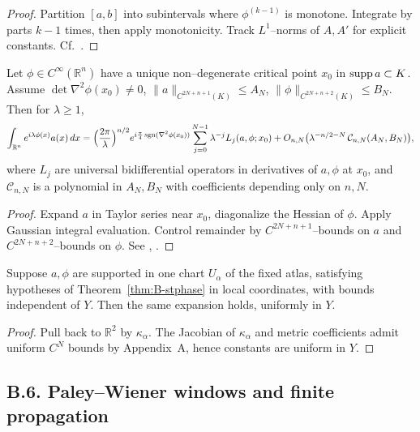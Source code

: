 \begin{proof}
Partition $[a,b]$ into subintervals where $\phi^{(k-1)}$ is monotone.
Integrate by parts $k-1$ times, then apply monotonicity.
Track $L^1$–norms of $A,A'$ for explicit constants.
Cf.\ \cite[Ch.~VIII, Thm.~1]{Stein93}.
\end{proof}

\begin{theorem}
\label{thm:B-stphase}
Let $\phi\in C^\infty(\mathbb R^n)$ have a unique non–degenerate critical point
$x_0$ in $\operatorname{supp} a\subset K$. Assume $\det\nabla^2\phi(x_0)\ne0$,
$\|a\|_{C^{2N+n+1}(K)}\le A_N$, $\|\phi\|_{C^{2N+n+2}(K)}\le B_N$.
Then for $\lambda\ge1$,
\[
\int_{\mathbb R^n} e^{i\lambda\phi(x)}a(x)\,dx
=\Big(\frac{2\pi}{\lambda}\Big)^{n/2}
 e^{i\frac{\pi}{4}\operatorname{sgn}(\nabla^2\phi(x_0))}
 \sum_{j=0}^{N-1}\lambda^{-j}L_j(a,\phi;x_0)
+O_{n,N}\big(\lambda^{-n/2-N}\,\mathcal C_{n,N}(A_N,B_N)\big),
\]
where $L_j$ are universal bidifferential operators in derivatives of $a,\phi$ at $x_0$,
and $\mathcal C_{n,N}$ is a polynomial in $A_N,B_N$ with coefficients depending only on $n,N$.
\end{theorem}

\begin{proof}
Expand $a$ in Taylor series near $x_0$, diagonalize the Hessian of $\phi$.
Apply Gaussian integral evaluation. Control remainder by $C^{2N+n+1}$–bounds on $a$
and $C^{2N+n+2}$–bounds on $\phi$. See \cite[Thm.~7.7.5]{HormanderI}, \cite[§3]{Zworski}.
\end{proof}

\begin{corollary}
\label{cor:B-stphase-charts}
Suppose $a,\phi$ are supported in one chart $U_\alpha$ of the fixed atlas,
satisfying hypotheses of Theorem~\ref{thm:B-stphase} in local coordinates,
with bounds independent of $Y$. Then the same expansion holds, uniformly in $Y$.
\end{corollary}

\begin{proof}
Pull back to $\mathbb R^2$ by $\kappa_\alpha$. The Jacobian of $\kappa_\alpha$ and metric
coefficients admit uniform $C^N$ bounds by Appendix~A, hence constants are uniform in $Y$.
\end{proof}

\subsection*{B.6. Paley–Wiener windows and finite propagation}
\label{subsec:B6-PW}

